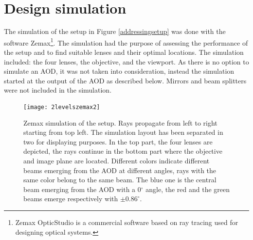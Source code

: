 \section{Design simulation}
The simulation of the setup in Figure \ref{addressingsetup} was done with the software Zemax\footnote{Zemax OpticStudio is a commercial software based on ray tracing used for designing optical systems.}. The simulation had the purpose of assessing the performance of the setup and to find suitable lenses and their optimal locations. The simulation included: the four lenses, the objective, and the viewport. As there is no option to simulate an AOD, it was not taken into consideration, instead the simulation started at the output of the AOD as described below. Mirrors and beam splitters were not included in the simulation.
\begin{figure}
\centering
\texttt{[image: 2levelszemax2]}
\caption{Zemax simulation of the setup. Rays propagate from left to right starting from top left. The simulation layout has been separated in two for displaying purposes. In the top part, the four lenses are depicted, the rays continue in the bottom part where the objective and image plane are located. Different colors indicate different beams emerging from the AOD at different angles, rays with the same color belong to the same beam. The blue one is the central beam emerging from the AOD with a 0$^\circ$ angle, the red and the green beams emerge respectively with $\pm0.86^\circ$.}
\label{zemaxview}
\end{figure}
